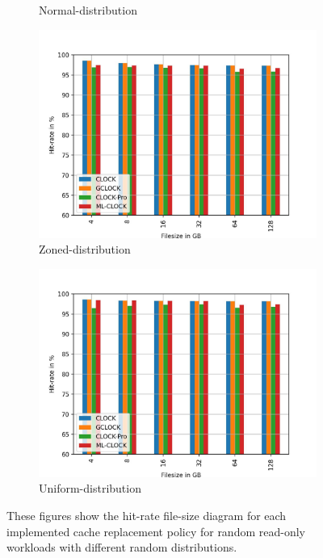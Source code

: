 \documentclass[
	12pt,
	a4paper,
	abstract,
	bibliography=totoc,
	chapterprefix,
	headings=openright,
	numbers=endperiod,
	parskip=half,
	twoside,
]{scrreprt}
\begin{document}
\begin{figure}
\begin{subfigure}{0.4\textwidth}
		\caption{Normal-distribution}
		\label{fig:randread normal}
	\end{subfigure}
	\hfill
	\begin{subfigure}{0.4\textwidth}
		\includegraphics[width=\textwidth]{randread_zoned.jpg}		
		\caption{Zoned-distribution}
		\label{fig:randread zoned}
	\end{subfigure}
	\hfill
	\begin{subfigure}{0.4\textwidth}
		\includegraphics[width=\textwidth]{randread_uniform.jpg}		
		\caption{Uniform-distribution}
		\label{fig:randread uniform}
	\end{subfigure}
	\caption{These figures show the hit-rate file-size diagram for each implemented 		cache replacement policy for random read-only workloads with different 				random distributions.}
\end{figure}
\end{document}
